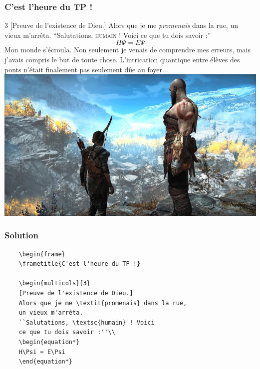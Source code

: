 \documentclass[handout]{beamer}
\begin{document}
\begin{frame}
	\frametitle{C'est l'heure du TP !}

	\begin{multicols}{3}
	[Preuve de l'existence de Dieu.]
	Alors que je me \textit{promenais} dans la rue, un vieux m'arrêta. ``Salutations, \textsc{humain} ! Voici ce que tu dois savoir :''\\
	\begin{equation*}
		H\Psi = E\Psi
	\end{equation*}
	Mon monde s'écroula. Non seulement je venais de comprendre mes erreurs, mais j'avais compris le but de toute chose. L'intrication quantique entre élèves des ponts n'était finalement pas seulement dûe au foyer...\\

	\includegraphics[scale=0.1]{Images/Beamer/dieu.jpg}

	\end{multicols}

\end{frame}

\begin{frame}[fragile=singleslide]
	\frametitle{Solution}
	\begin{verbatim}
	\begin{frame}
	\frametitle{C'est l'heure du TP !}
	
	\begin{multicols}{3}
	[Preuve de l'existence de Dieu.]
	Alors que je me \textit{promenais} dans la rue, 
	un vieux m'arrêta. 
	``Salutations, \textsc{humain} ! Voici
	ce que tu dois savoir :''\\
	\begin{equation*}
	H\Psi = E\Psi
	\end{equation*}
	\end{verbatim}
	
\end{frame}
\end{document}
